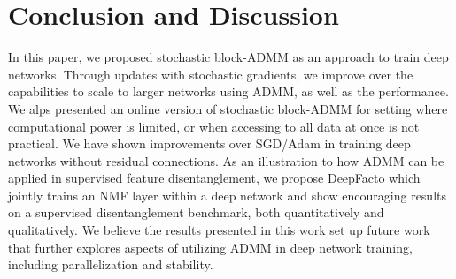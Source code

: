 \section{Conclusion and Discussion}
In this paper, we proposed stochastic block-ADMM as an approach to train deep networks. Through updates with stochastic gradients, we improve over the capabilities to scale to larger networks using ADMM, as well as the performance. We alps presented an online version of stochastic block-ADMM for setting where computational power is limited, or when accessing to all data at once is not practical. %
We have shown improvements over SGD/Adam in training deep networks without residual connections. As an illustration to how ADMM can be applied in supervised feature disentanglement, we propose DeepFacto which jointly trains an NMF layer within a deep network and show encouraging results on a supervised disentanglement benchmark, both quantitatively and qualitatively. We believe the results presented in this work set up future work that further explores aspects of utilizing ADMM in deep network training, including parallelization and stability.
